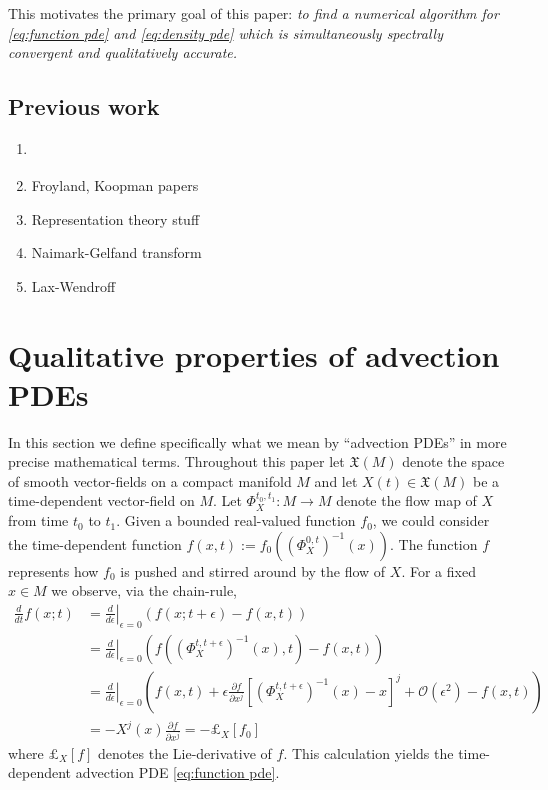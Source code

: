 \documentclass[12pt]{amsart}
\newcommand{\pder}[2]{\ensuremath{\frac{ \partial #1}{\partial #2}}}
\begin{document}
This motivates the primary goal of this paper:
\emph{to find a numerical algorithm for \eqref{eq:function pde} and \eqref{eq:density pde} which is simultaneously spectrally convergent and qualitatively accurate.}

\subsection{Previous work}

\begin{enumerate}
	\item \cite{HenrionKorda2014}
	\item Froyland, Koopman papers
	\item Representation theory stuff \cite{VershilGelfandGraev1975,Ismagilov1975}
	\item Naimark-Gelfand transform 
	\item Lax-Wendroff
\end{enumerate}

\section{Qualitative properties of advection PDEs}
\label{sec:properties}
In this section we define specifically what we mean by ``advection PDEs'' in more precise mathematical terms.
Throughout this paper let $\mathfrak{X}(M)$ denote the space of smooth vector-fields on a compact manifold $M$
and let $X(t) \in \mathfrak{X}(M)$ be a time-dependent vector-field on $M$.
Let $\Phi^{t_{0},t_{1}}_{X}:M\to M$ denote the flow map of $X$ from time $t_{0}$ to $t_{1}$.
Given a bounded real-valued function $f_{0}$, we could consider the time-dependent function $f(x,t) := f_{0} ( (\Phi_{X}^{0,t})^{-1}(x) )$.
The function $f$ represents how $f_{0}$ is pushed and stirred around by the flow of $X$.
For a fixed $x \in M$ we observe, via the chain-rule,
\begin{align}
	 \frac{d}{dt}  f(x;t) &=  \left. \frac{d}{d \epsilon} \right|_{\epsilon=0} ( f(x;t+\epsilon) - f(x,t) ) \\
	 &=  \left. \frac{d}{d \epsilon} \right|_{\epsilon=0} \left( f( (\Phi_{X}^{t,t+\epsilon})^{-1}(x) , t ) - f(x,t) \right) \\
	 &=  \left. \frac{d}{d \epsilon} \right|_{\epsilon=0} \left( f(x,t) + \epsilon \pder{f}{x^{j}} [ (\Phi_{X}^{t,t+\epsilon})^{-1}(x) - x ]^{j} + \mathcal{O}(\epsilon^{2}) - f(x,t) \right) \\
	 &= - X^{j}(x) \pder{f}{x^{j}} = - \pounds_{X}[f_{0}]
\end{align}
where $\pounds_{X}[f]$ denotes the Lie-derivative of $f$.
This calculation yields the time-dependent advection PDE \eqref{eq:function pde}.
\end{document}
